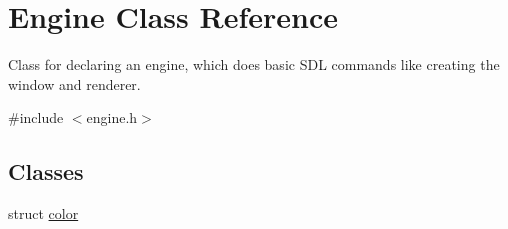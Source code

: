 \hypertarget{classEngine}{}\section{Engine Class Reference}
\label{classEngine}


Class for declaring an engine, which does basic S\+DL commands like creating the window and renderer.  




{\ttfamily \#include $<$engine.\+h$>$}

\subsection*{Classes}
\begin{DoxyCompactItemize}
\item 
struct \hyperlink{structEngine_1_1color}{color}
\end{DoxyCompactItemize}
